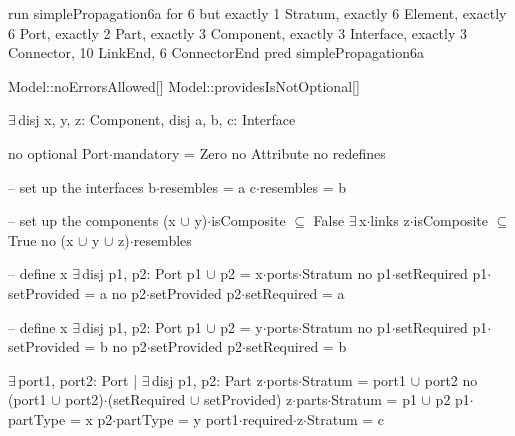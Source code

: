 run simplePropagation6a for 6 but exactly 1 Stratum, exactly 6 Element, exactly 6 Port, exactly 2 Part, exactly 3 Component, exactly 3 Interface, exactly 3 Connector, 10 LinkEnd, 6 ConnectorEnd
pred simplePropagation6a
{
  Model::noErrorsAllowed[]
  Model::providesIsNotOptional[]

  $\exists\,$disj x, y, z: Component,
       disj a, b, c: Interface
  {
    no optional
    Port$\cdot$mandatory = Zero
    no Attribute
    no redefines
  
    -- set up the interfaces
    b$\cdot$resembles = a
    c$\cdot$resembles = b
  
    -- set up the components
    (x $\cup$ y)$\cdot$isComposite $\subseteq$ False
    $\exists\,$x$\cdot$links
    z$\cdot$isComposite $\subseteq$ True
    no (x $\cup$ y $\cup$ z)$\cdot$resembles
    
    -- define x
    $\exists\,$disj p1, p2: Port
    {
      p1 $\cup$ p2 = x$\cdot$ports$\cdot$Stratum
      no p1$\cdot$setRequired
      p1$\cdot$setProvided = a
      no p2$\cdot$setProvided
      p2$\cdot$setRequired = a
    }
    
    -- define x
    $\exists\,$disj p1, p2: Port
    {
      p1 $\cup$ p2 = y$\cdot$ports$\cdot$Stratum
      no p1$\cdot$setRequired
      p1$\cdot$setProvided = b
      no p2$\cdot$setProvided
      p2$\cdot$setRequired = b
    }
    
    $\exists\,$port1, port2: Port | $\exists\,$disj p1, p2: Part
    {
      z$\cdot$ports$\cdot$Stratum = port1 $\cup$ port2
      no (port1 $\cup$ port2)$\cdot$(setRequired $\cup$ setProvided)
      z$\cdot$parts$\cdot$Stratum = p1 $\cup$ p2
      p1$\cdot$partType = x
      p2$\cdot$partType = y
      port1$\cdot$required$\cdot$z$\cdot$Stratum = c
    }
  }
}

